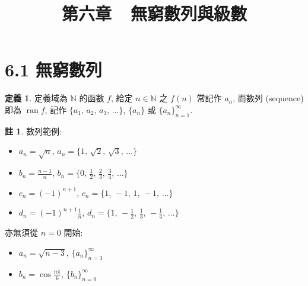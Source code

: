 \documentclass[12pt]{extarticle}
\newcommand{\ds}{\displaystyle}
\DeclareMathOperator*{\ran}{ran}
\theoremstyle{definition}
\newtheorem*{dfn}{定義}
\newtheorem*{rmk}{註}
\begin{document}
\title{\texorpdfstring{\vspace{-16mm} 第六章\ \ 無窮數列與級數}{第六章\ \ 無窮數列與級數}} 
\author{\vspace{-5em}}
\date{\vspace{-5em}}
\maketitle
\thispagestyle{firststyle}

\section*{6.1 無窮數列}

\begin{dfn}
  定義域為 $\mathbb{N}$ 的函數 $f$, 給定 $n\in\mathbb{N}$ 之 $f(n)$ 常記作 $a_n$, 而數列 (sequence) 即為 $\ran f$, 記作 $\{a_1,\,a_2,\,a_3,\,\ldots\}$, $\{a_n\}$ 或 $\ds\{a_n\}_{n = 1}^\infty$. 
\end{dfn}

\begin{rmk} 數列範例: 
  \begin{multicols}{2}
  \begin{itemize}\setlength{\itemsep}{0pt}
    \item $a_n = \sqrt{n}$, ${a_n} = \{1,\,\sqrt{2},\,\sqrt{3},\,\ldots\}$
    \item $\ds b_n = \frac{n - 1}{n}$, $\ds {b_n} = \Big\{0,\,\frac{1}{2},\,\frac{2}{3},\,\frac{3}{4},\,\ldots\Big\}$
    \item $c_n = (-1)^{n + 1}$, ${c_n} = \{1,\,-1,\,1,\,-1,\,\ldots\}$
    \item $\ds d_n = (-1)^{n + 1}\frac{1}{n}$, $\ds {d_n} = \Big\{1,\,-\frac{1}{2},\,\frac{1}{3},\,-\frac{1}{4},\,\ldots\Big\}$
  \end{itemize}
  \end{multicols}
  亦無須從 $n = 0$ 開始: 
  \begin{multicols}{2}
  \begin{itemize}\setlength{\itemsep}{0pt}
    \item $a_n = \sqrt{n - 3}$, $\ds\{a_n\}_{n = 3}^\infty$
    \item $\ds b_n = \cos\frac{n\pi}{6}$, $\ds\{b_n\}_{n = 0}^\infty$
  \end{itemize}
  \end{multicols}
\end{rmk}
\end{document}
